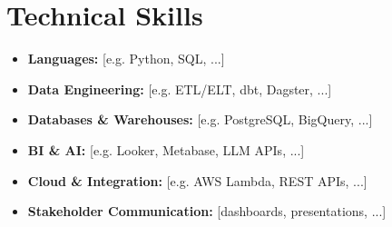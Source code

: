 
\section{Technical Skills}
\begin{itemize}[leftmargin=30pt, label=\textbullet, itemsep=1pt]
  \item \textbf{Languages:} [e.g. Python, SQL, ...]
  \item \textbf{Data Engineering:} [e.g. ETL/ELT, dbt, Dagster, ...]
  \item \textbf{Databases \& Warehouses:} [e.g. PostgreSQL, BigQuery, ...]
  \item \textbf{BI \& AI:} [e.g. Looker, Metabase, LLM APIs, ...]
  \item \textbf{Cloud \& Integration:} [e.g. AWS Lambda, REST APIs, ...]
  \item \textbf{Stakeholder Communication:} [dashboards, presentations, ...]
\end{itemize}
